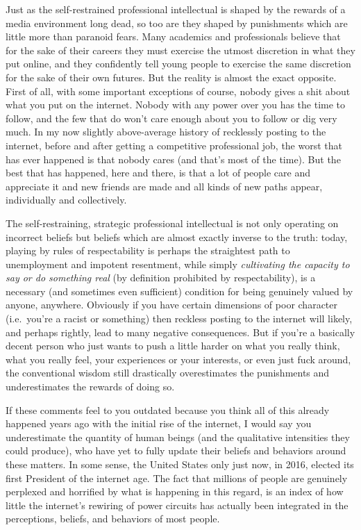 \documentclass[a4paper,12pt,margin=.5in]{article}
\begin{document}
Just as the self-restrained professional intellectual is shaped by the
rewards of a media environment long dead, so too are they shaped by
punishments which are little more than paranoid fears. Many academics
and professionals believe that for the sake of their careers they must
exercise the utmost discretion in what they put online, and they
confidently tell young people to exercise the same discretion for the
sake of their own futures. But the reality is almost the exact opposite.
First of all, with some important exceptions of course, nobody gives a
shit about what you put on the internet. Nobody with any power over you
has the time to follow, and the few that do won't care enough about you
to follow or dig very much. In my now slightly above-average history of
recklessly posting to the internet, before and after getting a
competitive professional job, the worst that has ever happened is that
nobody cares (and that's most of the time). But the best that has
happened, here and there, is that a lot of people care and appreciate it
and new friends are made and all kinds of new paths appear, individually
and collectively.

The self-restraining, strategic professional intellectual is not only
operating on incorrect beliefs but beliefs which are almost exactly
inverse to the truth: today, playing by rules of respectability is
perhaps the straightest path to unemployment and impotent resentment,
while simply \emph{cultivating the capacity to say or do something real}
(by definition prohibited by respectability), is a necessary (and
sometimes even sufficient) condition for being genuinely valued by
anyone, anywhere. Obviously if you have certain dimensions of poor
character (i.e.~you're a racist or something) then reckless posting to
the internet will likely, and perhaps rightly, lead to many negative
consequences. But if you're a basically decent person who just wants to
push a little harder on what you really think, what you really feel,
your experiences or your interests, or even just fuck around, the
conventional wisdom still drastically overestimates the punishments and
underestimates the rewards of doing so.

If these comments feel to you outdated because you think all of this
already happened years ago with the initial rise of the internet, I
would say you underestimate the quantity of human beings (and the
qualitative intensities they could produce), who have yet to fully
update their beliefs and behaviors around these matters. In some sense,
the United States only just now, in 2016, elected its first President of
the internet age. The fact that millions of people are genuinely
perplexed and horrified by what is happening in this regard, is an index
of how little the internet's rewiring of power circuits has actually
been integrated in the perceptions, beliefs, and behaviors of most
people.
\end{document}
